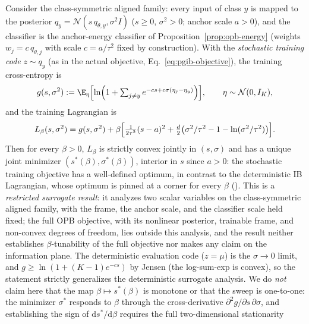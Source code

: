 \begin{proposition}
\label{prop:opb-sweep}
Consider the class-symmetric aligned family: every input of class $y$ is mapped to the
posterior $q_y = \mathcal{N}(s\,q_{\theta,y}, \sigma^2 I)$ ($s \ge 0$, $\sigma^2 > 0$;
anchor scale $a > 0$), and the classifier is the anchor-energy classifier of
Proposition~\ref{prop:opb-energy} (weights $w_j = c\,q_{\theta,j}$ with scale
$c = a/\tau^2$ fixed by construction). With the \emph{stochastic training code}
$z \sim q_y$ (as in the actual objective, Eq.~\eqref{eq:pgib-objective}), the
training cross-entropy is
\begin{equation}
g(s, \sigma^2) := \E_\eta\Bigl[
\ln\Bigl(1 + \textstyle\sum_{j \ne y} e^{-cs + c\sigma(\eta_j - \eta_y)}\Bigr)
\Bigr],
\qquad \eta \sim \mathcal{N}(0, I_K),
\label{eq:opb-ce-train}
\end{equation}
and the training Lagrangian is
\begin{equation}
L_\beta(s, \sigma^2) = g(s, \sigma^2)
+ \beta\Bigl[
\tfrac{1}{2\tau^2}(s-a)^2
+ \tfrac{d}{2}\bigl(\sigma^2/\tau^2 - 1 - \ln(\sigma^2/\tau^2)\bigr)
\Bigr].
\label{eq:opb-lag-train}
\end{equation}
Then for every $\beta > 0$, $L_\beta$ is strictly convex jointly in $(s, \sigma)$ and
has a unique joint minimizer $(s^*(\beta), \sigma^*(\beta))$, interior in $s$ since
$a > 0$: the stochastic training objective has a well-defined optimum, in contrast to
the deterministic IB Lagrangian, whose optimum is pinned at a corner for every $\beta$
(\citealp{kolchinsky2019caveats}). This is a \emph{restricted surrogate result}: it
analyzes two scalar variables on the class-symmetric aligned family, with the frame,
the anchor scale, and the classifier scale held fixed; the full OPB objective, with
its nonlinear posterior, trainable frame, and non-convex degrees of freedom, lies
outside this analysis, and the result neither establishes $\beta$-tunability of the
full objective nor makes any claim on the information plane.
The deterministic evaluation code ($z = \mu$) is the $\sigma \to 0$ limit, and
$g \ge \ln(1 + (K-1)e^{-cs})$ by Jensen (the log-sum-exp is convex), so the statement
strictly generalizes the deterministic surrogate analysis. We do \emph{not} claim here
that the map $\beta \mapsto s^*(\beta)$ is monotone or that the sweep is one-to-one:
the minimizer $\sigma^*$ responds to $\beta$ through the cross-derivative
$\partial^2 g/\partial s\,\partial\sigma$, and establishing the sign of
$\mathrm{d}s^*/\mathrm{d}\beta$ requires the full two-dimensional stationarity

\end{proposition}
